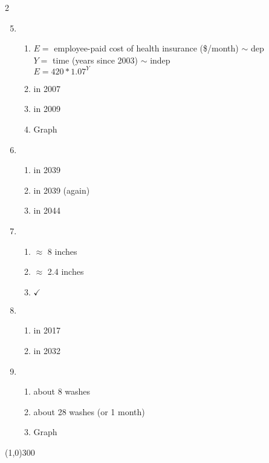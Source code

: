 \begin{multicols} {2}
\begin{enumerate}
\setcounter{enumi}{4}

\item %
\begin{enumerate}
\item $E=$ employee-paid cost of health insurance (\$/month) $\sim$ dep \\ $Y=$ time (years since 2003) $\sim$ indep \\ $E= 420 \ast 1.07^Y$
\item in 2007
\item in 2009
\item Graph
\end{enumerate}

\item %
\begin{enumerate}
\item in 2039
\item in 2039 (again)
\item in 2044
\end{enumerate}

\item %
\begin{enumerate}
\item $\approx$ 8 inches
\item $\approx$ 2.4 inches
\item $\checkmark$
\end{enumerate}

\item %
\begin{enumerate}
\item in 2017
\item in 2032
\end{enumerate}

\item %
\begin{enumerate}
\item about 8 washes
\item about 28 washes (or 1 month)
\item Graph
\end{enumerate}

\end{enumerate}
\end{multicols}

\begin{center}
\line(1,0){300} %
\end{center}


